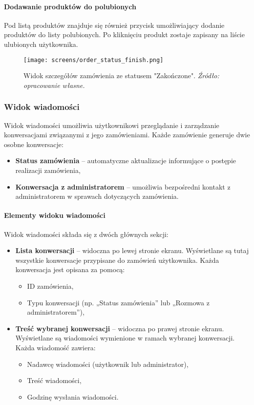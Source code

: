 \documentclass[12pt,a4paper,oneside]{article}
\theoremstyle{definition}
\numberwithin{equation}{section}
\begin{document}
\paragraph{Dodawanie produktów do polubionych}
Pod listą produktów znajduje się również przycisk umożliwiający dodanie produktów do listy polubionych. Po kliknięciu produkt zostaje zapisany na liście ulubionych użytkownika.

\begin{figure}[H]
    \centering
    \texttt{[image: screens/order\_status\_finish.png]}
    \caption{Widok szczegółów zamówienia ze statusem "Zakończone". \emph{Źródło: opracowanie własne.}}
    \label{fig:order_status_finish}
\end{figure}




\subsubsection{Widok wiadomości}
Widok wiadomości umożliwia użytkownikowi przeglądanie i zarządzanie konwersacjami związanymi z jego zamówieniami. Każde zamówienie generuje dwie osobne konwersacje:
\begin{itemize}
    \item \textbf{Status zamówienia} – automatyczne aktualizacje informujące o postępie realizacji zamówienia,
    \item \textbf{Konwersacja z administratorem} – umożliwia bezpośredni kontakt z administratorem w sprawach dotyczących zamówienia.
\end{itemize}

\paragraph{Elementy widoku wiadomości}
Widok wiadomości składa się z dwóch głównych sekcji:
\begin{itemize}
    \item \textbf{Lista konwersacji} – widoczna po lewej stronie ekranu. Wyświetlane są tutaj wszystkie konwersacje przypisane do zamówień użytkownika. Każda konwersacja jest opisana za pomocą:
    \begin{itemize}
        \item ID zamówienia,
        \item Typu konwersacji (np. „Status zamówienia” lub „Rozmowa z administratorem”),
    \end{itemize}
    \item \textbf{Treść wybranej konwersacji} – widoczna po prawej stronie ekranu. Wyświetlane są wiadomości wymienione w ramach wybranej konwersacji. Każda wiadomość zawiera:
    \begin{itemize}
        \item Nadawcę wiadomości (użytkownik lub administrator),
        \item Treść wiadomości,
        \item Godzinę wysłania wiadomości.
    \end{itemize}
\end{itemize}
\end{document}
